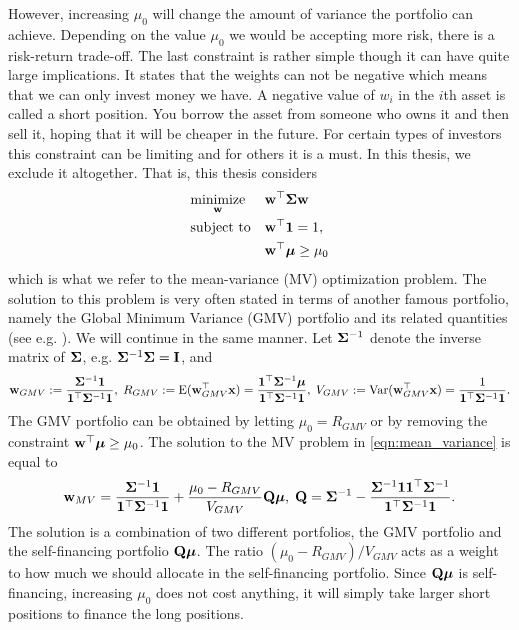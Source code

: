 \documentclass[oneside]{book}\usepackage{knitr}
\begin{document}
However, increasing $\mu_0$ will change the amount of variance the portfolio can achieve. 
Depending on the value $\mu_0$ we would be accepting more risk, there is a risk-return trade-off. 
The last constraint is rather simple though it can have quite large implications. 
It states that the weights can not be negative which means that we can only invest money we have. 
A negative value of $w_i$ in the $i$th asset is called a short position.
You borrow the asset from someone who owns it and then sell it, hoping that it will be cheaper in the future.
For certain types of investors this constraint can be limiting and for others it is a must.
In this thesis, we exclude it altogether. That is, this thesis considers
\begin{equation}\label{eqn:mean_variance}
\begin{aligned}
& \underset{\mathbf{w}}{\text{minimize}} 
& & \mathbf{w}^\top \mathbf{\Sigma} \mathbf{w} \\
& \text{subject to}
& & \mathbf{w}^\top \mathbf{1} = 1, \\
& && \mathbf{w}^\top \mbox{\boldmath$\mu$} \geq \mu_0 \\
\end{aligned}
\end{equation}
which is what we refer to the mean-variance (MV) optimization problem. 
The solution to this problem is very often stated in terms of another famous portfolio, namely the Global Minimum Variance (GMV) portfolio and its related quantities (see e.g. \textcite{Bodnar2009CaIotEFiEM, bodnar2013equivalence, bauder2018bayesian}). 
We will continue in the same manner. 
Let $\mathbf{\Sigma}^{-1}$ denote the inverse matrix of $\mathbf{\Sigma}$, e.g. $\mathbf{\Sigma}^{-1}\mathbf{\Sigma} = \mathbf{I}$, and
\begin{equation}\label{eqn:GMV}
	\mathbf{w}_{GMV} := \frac{\mathbf{\Sigma}^{-1}\mathbf{1}}{\mathbf{1}^\top \mathbf{\Sigma}^{-1}\mathbf{1}}, \; R_{GMV} :=\operatorname{E}(\mathbf{w}_{GMV}^\top\mathbf{x}) = \frac{\mathbf{1}^\top\mathbf{\Sigma}^{-1}\mbox{\boldmath$\mu$}}{\mathbf{1}^\top \mathbf{\Sigma}^{-1}\mathbf{1}}, \;
	V_{GMV} := \operatorname{Var}(\mathbf{w}_{GMV}^\top\mathbf{x}) =\frac{1}{\mathbf{1}^\top \mathbf{\Sigma}^{-1}\mathbf{1}}.
\end{equation}
The GMV portfolio can be obtained by letting $\mu_0=R_{GMV}$ or by removing the constraint $\mathbf{w}^\top \mbox{\boldmath$\mu$} \geq \mu_0$. 
The solution to the MV problem in \eqref{eqn:mean_variance} is equal to
\begin{equation}\label{eqn:mean_var_solution}
	\mathbf{w}_{MV} = \frac{\mathbf{\Sigma}^{-1}\mathbf{1}}{\mathbf{1}^\top \mathbf{\Sigma}^{-1}\mathbf{1}} + \frac{\mu_0 - R_{GMV}}{V_{GMV}} \mathbf{Q} \mbox{\boldmath$\mu$},\; \mathbf{Q} = \mathbf{\Sigma}^{-1} - \frac{\mathbf{\Sigma}^{-1} \mathbf{1} \mathbf{1}^\top \mathbf{\Sigma}^{-1}}{\mathbf{1}^\top \mathbf{\Sigma}^{-1} \mathbf{1}}.
\end{equation}
The solution is a combination of two different portfolios, the GMV portfolio and the self-financing portfolio $\mathbf{Q} \mbox{\boldmath$\mu$}$. 
The ratio $(\mu_0 - R_{GMV})/V_{GMV}$ acts as a weight to how much we should allocate in the self-financing portfolio. 
Since $\mathbf{Q} \mbox{\boldmath$\mu$}$ is self-financing, increasing $\mu_0$ does not cost anything, it will simply take larger short positions to finance the long positions.
\end{document}

